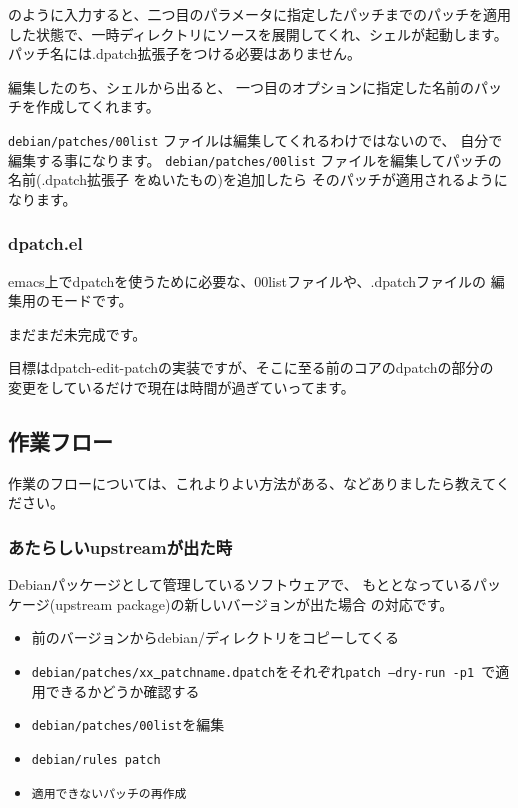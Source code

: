 \documentclass[mingoth,a4paper]{jsarticle}
\begin{document}
のように入力すると、二つ目のパラメータに指定したパッチまでのパッチを適用
した状態で、一時ディレクトリにソースを展開してくれ、シェルが起動します。
パッチ名には.dpatch拡張子をつける必要はありません。

編集したのち、シェルから出ると、
一つ目のオプションに指定した名前のパッチを作成してくれます。

{\tt debian/patches/00list} ファイルは編集してくれるわけではないので、
自分で編集する事になります。
{\tt debian/patches/00list} ファイルを編集してパッチの名前(.dpatch拡張子
をぬいたもの)を追加したら
そのパッチが適用されるようになります。

\subsubsection{dpatch.el}

emacs上でdpatchを使うために必要な、00listファイルや、.dpatchファイルの
編集用のモードです。

まだまだ未完成です。

目標はdpatch-edit-patchの実装ですが、そこに至る前のコアのdpatchの部分の
変更をしているだけで現在は時間が過ぎていってます。

\subsection{作業フロー}

作業のフローについては、これよりよい方法がある、などありましたら教えてく
ださい。

\subsubsection{あたらしいupstreamが出た時}

Debianパッケージとして管理しているソフトウェアで、
もととなっているパッケージ(upstream package)の新しいバージョンが出た場合
の対応です。

\begin{itemize}
 \item  前のバージョンからdebian/ディレクトリをコピーしてくる
 \item {\tt debian/patches/xx\underline{ }patchname.dpatch}をそれぞれ{\tt  patch --dry-run -p1 }で適用できるかどうか確認する
 \item {\tt debian/patches/00list}を編集
 \item {\tt  debian/rules patch}
 \item {\tt 適用できないパッチの再作成}
\end{itemize}
\end{document}
